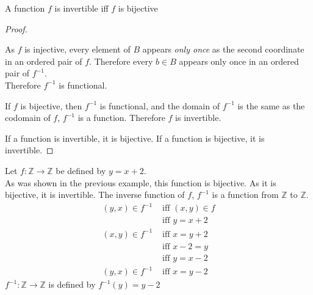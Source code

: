 \documentclass[../notes.tex]{subfiles}
\begin{document}
\begin{theorem}{A function $f$ is invertible iff $f$ is bijective}
\begin{proof}
\begin{indentparagraph}
\begin{subproof}[Subproof]
								As $f$ is injective, every element of $B$ appears \emph{only once} as the second coordinate in an ordered pair of $f$. Therefore every $b \in B$ appears only once in an ordered pair of $f^{-1}$.\\
								Therefore $f^{-1}$ is functional.

								If $f$ is bijective, then $f^{-1}$ is functional, and the domain of $f^{-1}$ is the same as the codomain of $f$, $f^{-1}$ is a function. Therefore $f$ is invertible.
							\end{subproof}
						\end{indentparagraph}
						If a function is invertible, it is bijective. If a function is bijective, it is invertible.
					\end{proof}
				\end{theorem}
				\begin{example}
					Let $f: \mathbb{Z} \rightarrow \mathbb{Z}$ be defined by $y = x + 2$.\\
					As was shown in the previous example, this function is bijective. As it is bijective, it is invertible. The inverse function of $f$, $f^{-1}$ is a function from $\mathbb{Z}$ to $\mathbb{Z}$.
					\begin{align*}
						(y, x) \in f^{-1} &\text{ iff } (x, y) \in f\\
						& \text{ iff } y = x + 2\\
						(x, y) \in f^{-1} &\text{ iff } x = y + 2 \tag*{(swap variables)}\\
						&\text{ iff } x - 2 = y \tag*{(solve for $y$)}\\
						&\text{ iff } y = x - 2\\
						(y, x) \in f^{-1} & \text{ iff } x = y - 2 \tag*{(swap variables back)}
					\end{align*}
					$f^{-1}: \mathbb{Z} \rightarrow \mathbb{Z}$ is defined by $f^{-1}(y) = y - 2$
				\end{example}
\end{document}

